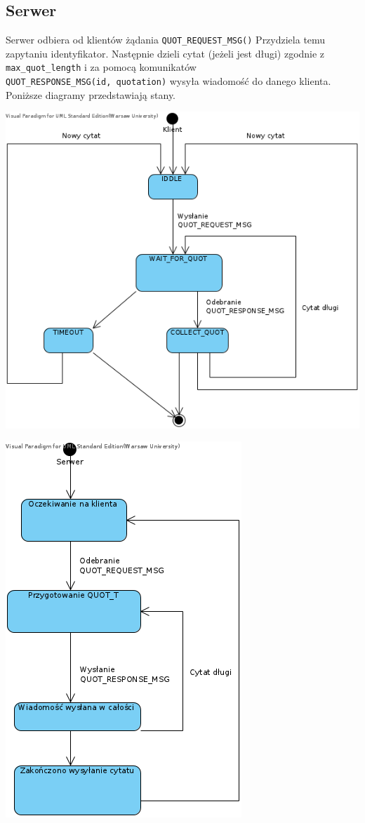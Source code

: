 \documentclass{article}
\begin{document}
\subsection{Serwer}
Serwer odbiera od klientów żądania \verb+QUOT_REQUEST_MSG()+ Przydziela temu zapytaniu identyfikator.
Następnie dzieli cytat (jeżeli jest długi) zgodnie z \verb+max_quot_length+
i za pomocą komunikatów \\ \verb+QUOT_RESPONSE_MSG(id, quotation)+ wysyła wiadomość do danego klienta.
Poniższe diagramy przedstawiają stany.
\begin{center}
\includegraphics[scale=2]{klient.png}
\end{center}
\begin{center}
\includegraphics[scale=2]{serwer.png}
\end{center}
\end{document}
